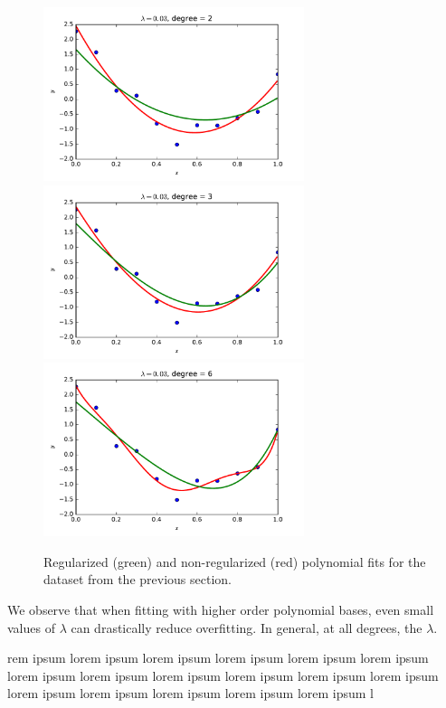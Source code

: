 \documentclass{article}
\begin{document}
\begin{multicols}{2}
\begin{figure}[p]
   \includegraphics[width=3in]{img/3-1_ridge_lambd30_degree2.pdf}
   \includegraphics[width=3in]{img/3-1_ridge_lambd30_degree3.pdf}
   \includegraphics[width=3in]{img/3-1_ridge_lambd30_degree6.pdf}
   \caption{Regularized (green) and non-regularized (red) polynomial fits for the dataset from the previous section.}
   \label{fig:ridge}
\end{figure}

We observe that when fitting with higher order polynomial bases, even small values of $\lambda$ can drastically reduce overfitting. In general, at all degrees, the $\lambda$.





rem ipsum lorem ipsum lorem ipsum lorem ipsum lorem ipsum lorem ipsum lorem ipsum lorem ipsum lorem ipsum lorem ipsum lorem ipsum lorem ipsum lorem ipsum lorem ipsum lorem ipsum lorem ipsum lorem ipsum l


\end{multicols}
\end{document}
